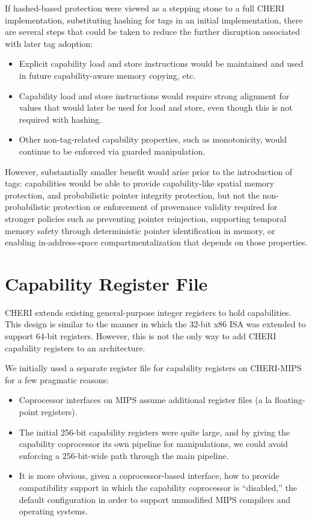 If hashed-based protection were viewed as a stepping stone to a full CHERI
implementation, substituting hashing for tags in an initial implementation,
there are several steps that could be taken to reduce the further disruption
associated with later tag adoption:

\begin{itemize}
\item Explicit capability load and store instructions would be maintained and
  used in future capability-aware memory copying, etc.

\item Capability load and store instructions would require strong alignment
  for values that would later be used for load and store, even though this is
  not required with hashing.

\item Other non-tag-related capability properties, such as monotonicity, would
  continue to be enforced via guarded manipulation.
\end{itemize}

However, substantially smaller benefit would arise prior to the introduction
of tags: capabilities would be able to provide capability-like spatial memory
protection, and probabilistic pointer integrity protection, but not the
non-probabilistic protection or enforcement of provenance validity required
for stronger policies such as preventing pointer reinjection, supporting
temporal memory safety through deterministic pointer identification in memory,
or enabling in-address-space compartmentalization that depends on those
properties.

\section{Capability Register File}

CHERI extends existing general-purpose integer registers to hold
capabilities.  This design is similar to the manner in which the
32-bit x86 ISA was extended to support 64-bit registers.  However,
this is not the only way to add CHERI capability registers to an architecture.

We initially used a separate register file for capability registers on CHERI-MIPS for a
few pragmatic reasons:

\begin{itemize}
\item Coprocessor interfaces on MIPS assume additional
  register files (a la floating-point registers).
\item The initial 256-bit capability registers were quite large, and by giving the capability
  coprocessor its own pipeline for manipulations, we could avoid enforcing a
  256-bit-wide path through the main pipeline.
\item It is more obvious, given a coprocessor-based interface, how to provide
  compatibility support in which the capability coprocessor is ``disabled,''
  the default configuration in order to support unmodified MIPS compilers and
  operating systems.
\end{itemize}

